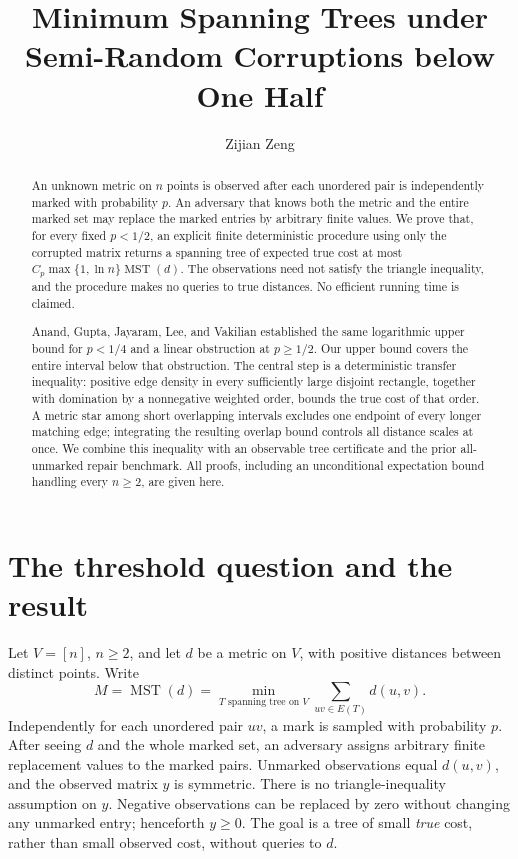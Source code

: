 \documentclass[acmlarge,screen,nonacm,11pt]{acmart}
\title{Minimum Spanning Trees under Semi-Random Corruptions below One Half}
\author{Zijian Zeng}
\affiliation{\institution{UCSI University}\country{Malaysia}}
\date{}
\newcommand{\MST}{\operatorname{MST}}
\begin{document}
\begin{abstract}
An unknown metric on $n$ points is observed after each unordered pair is independently marked with probability $p$. An adversary that knows both the metric and the entire marked set may replace the marked entries by arbitrary finite values. We prove that, for every fixed $p<1/2$, an explicit finite deterministic procedure using only the corrupted matrix returns a spanning tree of expected true cost at most $C_p\max\{1,\ln n\}\MST(d)$. The observations need not satisfy the triangle inequality, and the procedure makes no queries to true distances. No efficient running time is claimed.

Anand, Gupta, Jayaram, Lee, and Vakilian established the same logarithmic upper bound for $p<1/4$ and a linear obstruction at $p\geq 1/2$. Our upper bound covers the entire interval below that obstruction. The central step is a deterministic transfer inequality: positive edge density in every sufficiently large disjoint rectangle, together with domination by a nonnegative weighted order, bounds the true cost of that order. A metric star among short overlapping intervals excludes one endpoint of every longer matching edge; integrating the resulting overlap bound controls all distance scales at once. We combine this inequality with an observable tree certificate and the prior all-unmarked repair benchmark. All proofs, including an unconditional expectation bound handling every $n\geq2$, are given here.
\end{abstract}
\maketitle
\thispagestyle{plain}
\clearpage

\section{The threshold question and the result}
Let $V=[n]$, $n\geq2$, and let $d$ be a metric on $V$, with positive distances between distinct points. Write
\[
 M=\MST(d)=\min_{T\text{ spanning tree on }V}\sum_{uv\in E(T)}d(u,v).
\]
Independently for each unordered pair $uv$, a mark is sampled with probability $p$. After seeing $d$ and the whole marked set, an adversary assigns arbitrary finite replacement values to the marked pairs. Unmarked observations equal $d(u,v)$, and the observed matrix $y$ is symmetric. There is no triangle-inequality assumption on $y$. Negative observations can be replaced by zero without changing any unmarked entry; henceforth $y\geq0$. The goal is a tree of small \emph{true} cost, rather than small observed cost, without queries to $d$.
\end{document}
